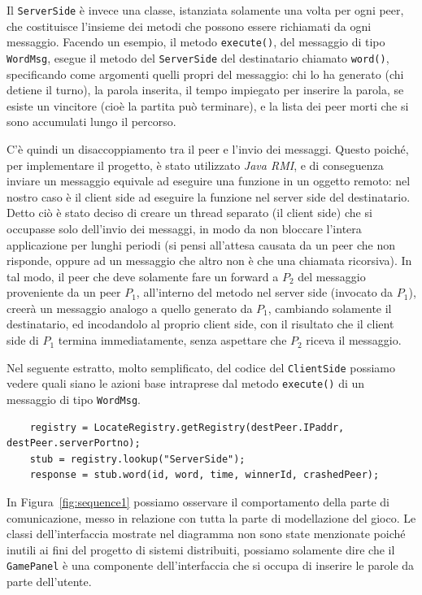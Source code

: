 \documentclass[10.5pt]{article}
\begin{document}
Il \texttt{ServerSide} è invece una classe, istanziata solamente una volta per ogni peer, che costituisce l'insieme dei metodi che possono essere richiamati da ogni messaggio. Facendo un esempio, il metodo \texttt{execute()}, del messaggio di tipo \texttt{WordMsg}, esegue il metodo del \texttt{ServerSide} del destinatario chiamato \texttt{word()}, specificando come argomenti quelli propri del messaggio: chi lo ha generato (chi detiene il turno), la parola inserita, il tempo impiegato per inserire la parola, se esiste un vincitore (cioè la partita può terminare), e la lista dei peer morti che si sono accumulati lungo il percorso.

C'è quindi un disaccoppiamento tra il peer e l'invio dei messaggi. Questo poiché, per implementare il progetto, è stato utilizzato \textit{Java RMI}, e di conseguenza inviare un messaggio equivale ad eseguire una funzione in un oggetto remoto: nel nostro caso è il client side ad eseguire la funzione nel server side del destinatario. Detto ciò è stato deciso di creare un thread separato (il client side) che si occupasse solo dell'invio dei messaggi, in modo da non bloccare l'intera applicazione per lunghi periodi (si pensi all'attesa causata da un peer che non risponde, oppure ad un messaggio che altro non è che una chiamata ricorsiva). In tal modo, il peer che deve solamente fare un forward a $P_2$ del messaggio proveniente da un peer $P_1$, all'interno del metodo nel server side (invocato da $P_1$), creerà un messaggio analogo a quello generato da $P_1$, cambiando solamente il destinatario, ed incodandolo al proprio client side, con il risultato che il client side di $P_1$ termina immediatamente, senza aspettare che $P_2$ riceva il messaggio. 

Nel seguente estratto, molto semplificato, del codice del \texttt{ClientSide} possiamo vedere quali siano le azioni base intraprese dal metodo \texttt{execute()} di un messaggio di tipo \texttt{WordMsg}.
\begin{verbatim}
	registry = LocateRegistry.getRegistry(destPeer.IPaddr, destPeer.serverPortno);
	stub = registry.lookup("ServerSide");
	response = stub.word(id, word, time, winnerId, crashedPeer);
\end{verbatim}

In Figura~\ref{fig:sequence1} possiamo osservare il comportamento della parte di comunicazione, messo in relazione con tutta la parte di modellazione del gioco. Le classi dell'interfaccia mostrate nel diagramma non sono state menzionate poiché inutili ai fini del progetto di sistemi distribuiti, possiamo solamente dire che il \texttt{GamePanel} è una componente dell'interfaccia che si occupa di inserire le parole da parte dell'utente.
\end{document}
